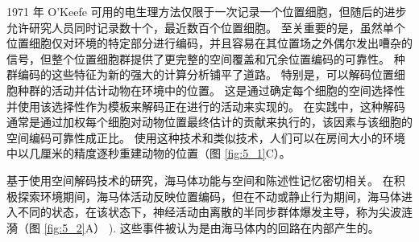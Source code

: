 1971 年 O’Keefe 可用的电生理方法仅限于一次记录一个位置细胞，但随后的进步允许研究人员同时记录数十个，最近数百个位置细胞。 
至关重要的是，虽然单个位置细胞仅对环境的特定部分进行编码，并且容易在其位置场之外偶尔发出嘈杂的信号，但整个位置细胞群提供了更完整的空间覆盖和冗余位置编码的可靠性。 
种群编码的这些特征为新的强大的计算分析铺平了道路。 
特别是，可以解码位置细胞种群的活动并估计动物在环境中的位置。 
这是通过确定每个细胞的空间选择性并使用该选择性作为模板来解码正在进行的活动来实现的。 
在实践中，这种解码通常是通过加权每个细胞对动物位置最终估计的贡献来执行的，该因素与该细胞的空间编码可靠性成正比。 
使用这种技术和类似技术，人们可以在房间大小的环境中以几厘米的精度逐秒重建动物的位置（图 \ref{fig:5_1}C）。



基于使用空间解码技术的研究，海马体功能与空间和陈述性记忆密切相关。 
在积极探索环境期间，海马体活动反映位置编码，但在不动或静止行为期间，海马体进入不同的状态，在该状态下，神经活动由离散的半同步群体爆发主导，称为尖波涟漪（图 \ref{fig:5_2}A） ). 这些事件被认为是由海马体内的回路在内部产生的。

